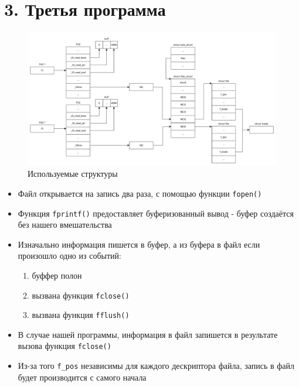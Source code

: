\clearpage

\section*{3. Третья программа}

\begin{figure}[h!btp]
	\centering
	\includegraphics[width=470pt]{inc/scheme3.pdf}
	\caption{Используемые структуры}
	\label{fig:scheme3}	
\end{figure}

\begin{itemize}
	\item Файл открывается на запись два раза, с помощью функции \texttt{fopen()}

	\item Функция \texttt{fprintf()} предоставляет буферизованный вывод - буфер создаётся без нашего вмешательства

	\item Изначально информация пишется в буфер, а из буфера в файл если произошло одно из
	событий:
	\begin{enumerate}
		\item буффер полон
		\item вызвана функция \texttt{fclose()}
		\item вызвана функция \texttt{fflush()}
	\end{enumerate}

	\item В случае нашей программы, информация в файл запишется в результате вызова функция \texttt{fclose()}

	\item Из-за того \texttt{f\_pos} независимы для каждого дескриптора файла, запись в файл будет производится с самого начала
\end{itemize}


